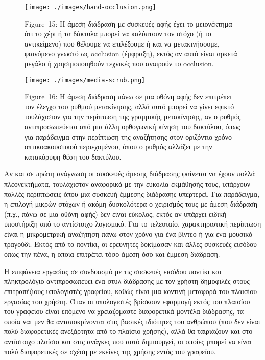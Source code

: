 \documentclass[
]{article}
\begin{document}
\leavevmode{}%
\begin{figure}
\hypertarget{fig:hand-occlusion}{%
\centering
\texttt{[image: ./images/hand-occlusion.png]}
\caption{Figure~15: Η άμεση διάδραση με συσκευές αφής έχει το
μειονέκτημα ότι το χέρι ή τα δάκτυλα μπορεί να καλύπτουν τον στόχο (ή το
αντικείμενο) που θέλουμε να επιλέξουμε ή και να μετακινήσουμε, φαινόμενο
γνωστό ως occlusion (έμφραξη), εκτός αν αυτό είναι αρκετά μεγάλο ή
χρησιμοποιηθούν τεχνικές που αναιρούν το
occlusion.}\label{fig:hand-occlusion}
}
\end{figure}

\leavevmode{}%
\begin{figure}
\hypertarget{fig:media-scrub}{%
\centering
\texttt{[image: ./images/media-scrub.png]}
\caption{Figure~16: Η άμεση διάδραση πάνω σε μια οθόνη αφής δεν
επιτρέπει τον έλεγχο του ρυθμού μετακίνησης, αλλά αυτό μπορεί να γίνει
εφικτό τουλάχιστον για την περίπτωση της γραμμικής μετακίνησης, αν ο
ρυθμός αντιπροσωπεύεται από μια άλλη ορθογωνική κίνηση του δακτύλου,
όπως για παράδειγμα στην περίπτωση της αναζήτησης στον οριζόντιο χρόνο
οπτικοακουστικού περιεχομένου, όπου ο ρυθμός αλλάζει με την κατακόρυφη
θέση του δακτύλου.}\label{fig:media-scrub}
}
\end{figure}

Αν και σε πρώτη ανάγνωση οι συσκευές άμεσης διάδρασης φαίνεται να έχουν
πολλά πλεονεκτήματα, τουλάχιστον αναφορικά με την ευκολία εκμάθησής
τους, υπάρχουν πολλές περιπτώσεις όπου μια συσκευή έμμεσης διάδρασης
υπερτερεί. Για παράδειγμα, η επιλογή μικρών στόχων ή ακόμη δυσκολότερα ο
χειρισμός τους με άμεση διάδραση (π.χ., πάνω σε μια οθόνη αφής) δεν
είναι εύκολος, εκτός αν υπάρχει ειδική υποστήριξη από το αντίστοιχο
λογισμικό. Για το τελευταίο, χαρακτηριστική περίπτωση είναι η
μικρομετρική αναζήτηση πάνω στον χρόνο για ένα βίντεο ή για ένα μουσικό
τραγούδι. Εκτός από το ποντίκι, οι ερευνητές δοκίμασαν και άλλες
συσκευές εισόδου όπως την πένα, η οποία επιτρέπει τόσο άμεση όσο και
έμμεση διάδραση.

Η επιφάνεια εργασίας σε συνδυασμό με τις συσκευές εισόδου ποντίκι και
πληκτρολόγιο αντιπροσωπεύει ένα στυλ διάδρασης με τον χρήστη δημοφιλές
στους επιτραπέζιους υπολογιστές γραφείου, καθώς είναι μια κοντινή
μεταφορά του πλαισίου εργασίας του χρήστη. Όταν οι υπολογιστές βρίσκουν
εφαρμογή εκτός του πλαισίου του γραφείου είναι επόμενο να χρειαζόμαστε
διαφορετικά μοντέλα διάδρασης, τα οποία ναι μεν θα ανταποκρίνονται στις
βασικές ιδιότητες του ανθρώπου (που δεν είναι πολύ διαφορετικές
ανεξάρτητα από το πλαίσιο χρήσης), αλλά θα ταιριάζουν και στο αντίστοιχο
πλαίσιο και στις ανάγκες που αυτό δημιουργεί, οι οποίες μπορεί να είναι
πολύ διαφορετικές σε σχέση με εκείνες της χρήσης εντός του γραφείου.
\end{document}
